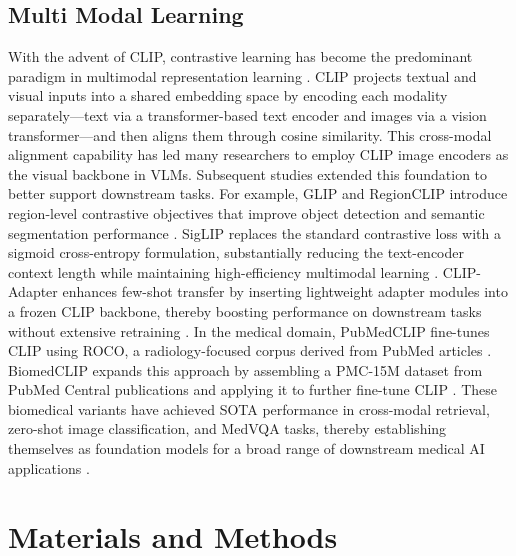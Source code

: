 \documentclass[bioengineering,article,submit,pdftex,moreauthors]{Definitions/mdpi}
\begin{document}
\subsection{Multi Modal Learning}
With the advent of CLIP, contrastive learning has become the predominant paradigm in multimodal representation learning \cite{radford_learning_2021}. 
CLIP projects textual and visual inputs into a shared embedding space by encoding each modality separately—text via a transformer-based text encoder and images via a vision transformer—and then aligns them through cosine similarity. 
This cross-modal alignment capability has led many researchers to employ CLIP image encoders as the visual backbone in VLMs. 
Subsequent studies extended this foundation to better support downstream tasks. For example, GLIP and RegionCLIP introduce region-level contrastive objectives that improve object detection and semantic segmentation performance \cite{li_grounded_2022,zhong_regionclip_2022}.
SigLIP replaces the standard contrastive loss with a sigmoid cross-entropy formulation, substantially reducing the text-encoder context length while maintaining high-efficiency multimodal learning \cite{zhai_sigmoid_2023}. 
CLIP-Adapter enhances few-shot transfer by inserting lightweight adapter modules into a frozen CLIP backbone, thereby boosting performance on downstream tasks without extensive retraining \cite{gao_clip-adapter_2024}. 
In the medical domain, PubMedCLIP fine-tunes CLIP using ROCO, a radiology-focused corpus derived from PubMed articles \cite{eslami_pubmedclip_2023,pelka_radiology_2018}. 
BiomedCLIP expands this approach by assembling a PMC-15M dataset from PubMed Central publications and applying it to further fine-tune CLIP \cite{zhang_biomedclip_2025}. 
These biomedical variants have achieved SOTA performance in cross-modal retrieval, zero-shot image classification, and MedVQA tasks, thereby establishing themselves as foundation models for a broad range of downstream medical AI applications \cite{koleilat_medclip-sam_2024,zhao_foundation_2024,polis_exploring_2025}.




\section{Materials and Methods}
\end{document}

